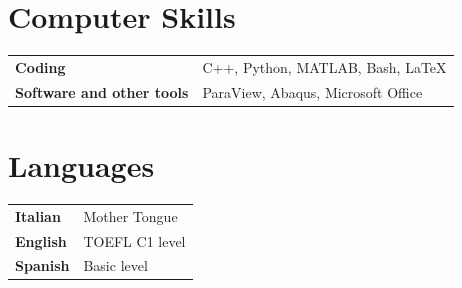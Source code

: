 \documentclass[10pt, a4paper]{article}
\begin{document}
\section{Computer Skills}
 
\renewcommand{\arraystretch}{1.3}
\begin{tabular}{@{} p{6cm} p{12.4cm} @{}}
  \textbf{Coding}     & C++, Python, MATLAB, Bash, \LaTeX \\
  \textbf{Software and other tools}   & ParaView, Abaqus, Microsoft Office \\
\end{tabular}
 
\section{Languages}
 
\renewcommand{\arraystretch}{1.3}
\begin{tabular}{@{} p{2.8cm} p{12.4cm} @{}}
  \textbf{Italian} & Mother Tongue \\
  \textbf{English} & TOEFL C1 level \\
  \textbf{Spanish} & Basic level \\
\end{tabular}
 
\end{document}
